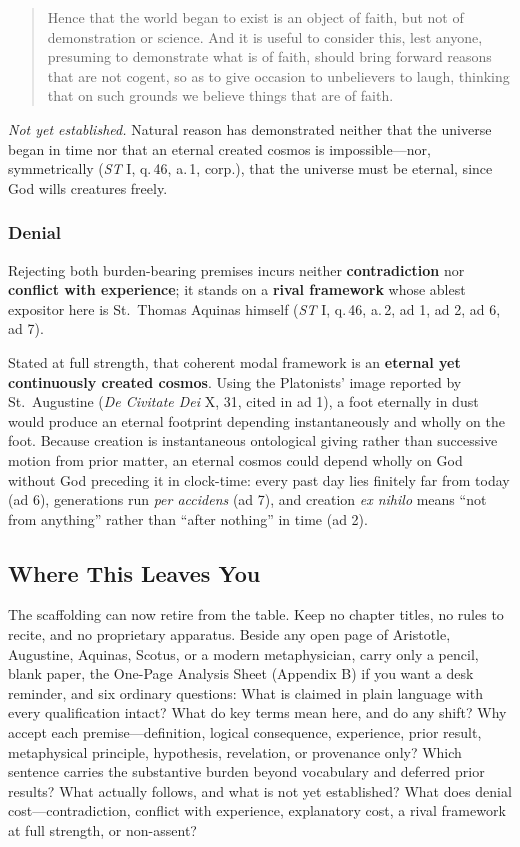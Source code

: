 \begin{quote}
Hence that the world began to exist is an object of faith, but not of demonstration or science. And it is useful to consider this, lest anyone, presuming to demonstrate what is of faith, should bring forward reasons that are not cogent, so as to give occasion to unbelievers to laugh, thinking that on such grounds we believe things that are of faith.
\end{quote}

\emph{Not yet established.} Natural reason has demonstrated neither that the universe began in time nor that an eternal created cosmos is impossible---nor, symmetrically (\emph{ST} I, q.\,46, a.\,1, corp.), that the universe must be eternal, since God wills creatures freely.

\subsubsection*{Denial}

Rejecting both burden-bearing premises incurs neither \textbf{contradiction} nor \textbf{conflict with experience}; it stands on a \textbf{rival framework} whose ablest expositor here is St.\ Thomas Aquinas himself (\emph{ST} I, q.\,46, a.\,2, ad 1, ad 2, ad 6, ad 7).

Stated at full strength, that coherent modal framework is an \textbf{eternal yet continuously created cosmos}. Using the Platonists' image reported by St.\ Augustine (\emph{De Civitate Dei} X, 31, cited in ad 1), a foot eternally in dust would produce an eternal footprint depending instantaneously and wholly on the foot. Because creation is instantaneous ontological giving rather than successive motion from prior matter, an eternal cosmos could depend wholly on God without God preceding it in clock-time: every past day lies finitely far from today (ad 6), generations run \emph{per accidens} (ad 7), and creation \emph{ex nihilo} means ``not from anything'' rather than ``after nothing'' in time (ad 2).

\subsection{Where This Leaves You}

The scaffolding can now retire from the table. Keep no chapter titles, no rules to recite, and no proprietary apparatus. Beside any open page of Aristotle, Augustine, Aquinas, Scotus, or a modern metaphysician, carry only a pencil, blank paper, the One-Page Analysis Sheet (Appendix B) if you want a desk reminder, and six ordinary questions: What is claimed in plain language with every qualification intact? What do key terms mean here, and do any shift? Why accept each premise---definition, logical consequence, experience, prior result, metaphysical principle, hypothesis, revelation, or provenance only? Which sentence carries the substantive burden beyond vocabulary and deferred prior results? What actually follows, and what is not yet established? What does denial cost---contradiction, conflict with experience, explanatory cost, a rival framework at full strength, or non-assent?


